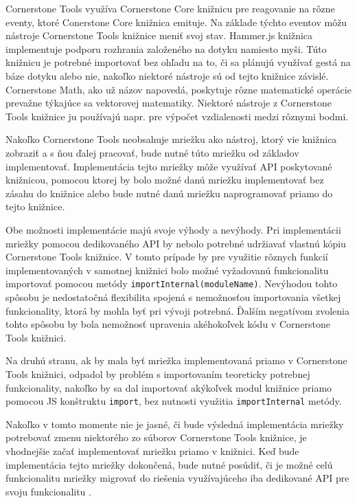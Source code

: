 Cornerstone Tools využíva Cornerstone Core knižnicu pre reagovanie na rôzne eventy, ktoré Conerstone Core knižnica emituje. Na základe týchto eventov môžu nástroje Cornerstone Tools knižnice meniť svoj stav.
Hammer.js knižnica implementuje podporu rozhrania založeného na dotyku namiesto myši. Túto knižnicu je potrebné importovať bez ohľadu na to, či sa plánujú využívať gestá na báze dotyku alebo nie, nakoľko niektoré nástroje sú od tejto knižnice závislé.
Cornerstone Math, ako už názov napovedá, poskytuje rôzne matematické operácie prevažne týkajúce sa vektorovej matematiky. Niektoré nástroje z Cornerstone Tools knižnice ju používajú napr. pre výpočet vzdialenosti medzi rôznymi bodmi.

Nakoľko Cornerstone Tools neobsahuje mriežku ako nástroj, ktorý vie knižnica zobraziť a s ňou ďalej pracovať, bude nutné túto mriežku od základov implementovať. Implementácia tejto mriežky môže využívať API poskytované knižnicou, pomocou ktorej by bolo možné danú mriežku implementovať bez zásahu do knižnice alebo bude nutné danú mriežku naprogramovať priamo do tejto knižnice.

Obe možnosti implementácie majú svoje výhody a nevýhody.
Pri implementácii mriežky pomocou dedikovaného API by nebolo potrebné udržiavať vlastnú kópiu Cornerstone Tools knižnice. V tomto prípade by pre využitie rôznych funkcií implementovaných v samotnej knižnici bolo možné vyžadovanú funkcionalitu importovať pomocou metódy \texttt{importInternal(moduleName)}. Nevýhodou tohto spôsobu je nedostatočná flexibilita spojená s nemožnosťou importovania všetkej funkcionality, ktorá by mohla byť pri vývoji potrebná. Ďalším negatívom zvolenia tohto spôsobu by bola nemožnosť upravenia akéhokoľvek kódu v Cornerstone Tools knižnici.

Na druhú stranu, ak by mala byť mriežka implementovaná priamo v Cornerstone Tools knižnici, odpadol by problém s importovaním teoreticky potrebnej funkcionality, nakoľko by sa dal importovať akýkoľvek modul knižnice priamo pomocou JS konštruktu \texttt{import}, bez nutnosti využitia \texttt{importInternal} metódy.

Nakoľko v tomto momente nie je jasné, či bude výsledná implementácia mriežky potrebovať zmenu niektorého zo súborov Cornerstone Tools knižnice, je vhodnejšie začať implementovať mriežku priamo v knižnici. Keď bude implementácia tejto mriežky dokončená, bude nutné posúdiť, či je možné celú funkcionalitu mriežky migrovať do riešenia využívajúceho iba dedikované API pre svoju funkcionalitu .

